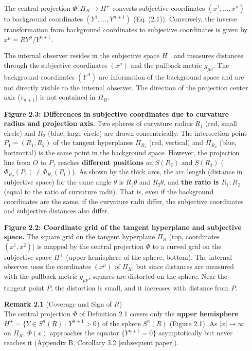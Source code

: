 \documentclass[a4paper,11pt]{article}
\theoremstyle{definition}
\begin{document}
The central projection \(\Phi: \Pi_R \to H^+\) converts subjective coordinates \((x^1, \ldots, x^n)\) to background coordinates \((Y^1, \ldots, Y^{n+1})\) (Eq. (2.1)). Conversely, the inverse transformation from background coordinates to subjective coordinates is given by \(x^\mu = RY^\mu/Y^{n+1}\).

The internal observer resides in the subjective space \(H^+\) and measures distances through the subjective coordinates \((x^\mu)\) and the pullback metric \(g_{\mu\nu}\). The background coordinates \((Y^A)\) are information of the background space and are not directly visible to the internal observer. The direction of the projection center axis (\(e_{n+1}\)) is not contained in \(\Pi_R\).

\textbf{Figure 2.3: Differences in subjective coordinates due to curvature radius and projection axis.} Two spheres of curvature radius \(R_1\) (red, small circle) and \(R_2\) (blue, large circle) are drawn concentrically. The intersection point \(P_1 = (R_1, R_2)\) of the tangent hyperplanes \(\Pi_{R_1}\) (red, vertical) and \(\Pi_{R_2}\) (blue, horizontal) is the same point in the background space. However, the projection line from \(O\) to \(P_1\) reaches \textbf{different positions} on \(S(R_2)\) and \(S(R_1)\) (\(\Phi_{R_2}(P_1) \neq \Phi_{R_1}(P_1)\)). As shown by the thick arcs, the arc length (distance in subjective space) for the same angle \(\theta\) is \(R_1\theta\) and \(R_2\theta\), and \textbf{the ratio is \(R_1 : R_2\)} (equal to the ratio of curvature radii). That is, even if the background coordinates are the same, if the curvature radii differ, the subjective coordinates and subjective distances also differ.

\textbf{Figure 2.2: Coordinate grid of the tangent hyperplane and subjective space.} The square grid on the tangent hyperplane \(\Pi_R\) (top, coordinates \((x^1, x^2)\)) is mapped by the central projection \(\Phi\) to a curved grid on the subjective space \(H^+\) (upper hemisphere of the sphere, bottom). The internal observer uses the coordinates \((x^\mu)\) of \(\Pi_R\), but since distances are measured with the pullback metric \(g_{\mu\nu}\), squares are distorted on the sphere. Near the tangent point \(P\), the distortion is small, and it increases with distance from \(P\).

\textbf{Remark 2.1} (Coverage and Sign of \(R\))\\
The central projection \(\Phi\) of Definition 2.1 covers only the \textbf{upper hemisphere} \(H^+ = \{Y \in S^n(R) \mid Y^{n+1} > 0\}\) of the sphere \(S^n(R)\) (Figure 2.1). As \(|x| \to \infty\) on \(\Pi_R\), \(\Phi(x)\) approaches the equator \(\{Y^{n+1} = 0\}\) asymptotically but never reaches it (Appendix B, Corollary 3.2 {[}subsequent paper{]}).
\end{document}
